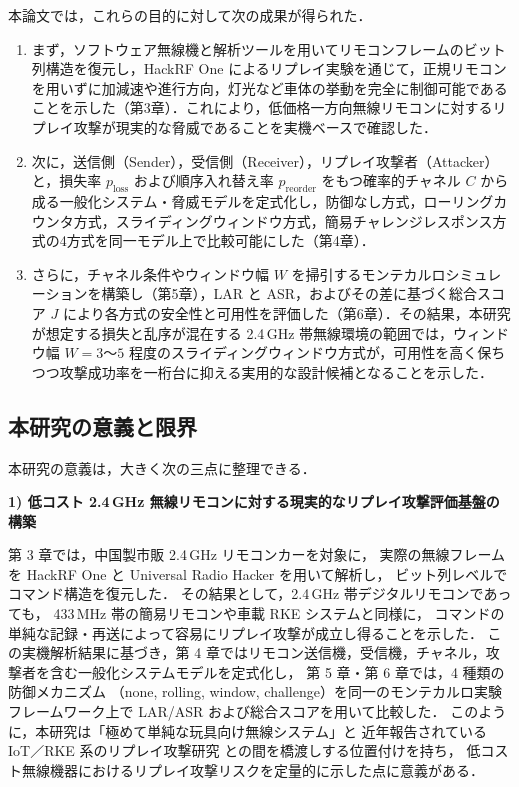 \documentclass[twocolumn,10pt,a4paper]{jsarticle}
\begin{document}
本論文では，これらの目的に対して次の成果が得られた．
\begin{enumerate}
  \item まず，ソフトウェア無線機と解析ツールを用いてリモコンフレームのビット列構造を復元し，HackRF One によるリプレイ実験を通じて，正規リモコンを用いずに加減速や進行方向，灯光など車体の挙動を完全に制御可能であることを示した（第3章）．これにより，低価格一方向無線リモコンに対するリプレイ攻撃が現実的な脅威であることを実機ベースで確認した．
  \item 次に，送信側（Sender），受信側（Receiver），リプレイ攻撃者（Attacker）と，損失率 $p_{\mathrm{loss}}$ および順序入れ替え率 $p_{\mathrm{reorder}}$ をもつ確率的チャネル $C$ から成る一般化システム・脅威モデルを定式化し，防御なし方式，ローリングカウンタ方式，スライディングウィンドウ方式，簡易チャレンジレスポンス方式の4方式を同一モデル上で比較可能にした（第4章）．
  \item さらに，チャネル条件やウィンドウ幅 $W$ を掃引するモンテカルロシミュレーションを構築し（第5章），LAR と ASR，およびその差に基づく総合スコア $J$ により各方式の安全性と可用性を評価した（第6章）．その結果，本研究が想定する損失と乱序が混在する 2.4\,GHz 帯無線環境の範囲では，ウィンドウ幅 $W=3$～$5$ 程度のスライディングウィンドウ方式が，可用性を高く保ちつつ攻撃成功率を一桁台に抑える実用的な設計候補となることを示した．
\end{enumerate}

\subsection{本研究の意義と限界}

本研究の意義は，大きく次の三点に整理できる．

\vspace{0.5em}
\noindent\textbf{1) 低コスト 2.4\,GHz 無線リモコンに対する現実的なリプレイ攻撃評価基盤の構築}\par
第 3 章では，中国製市販 2.4\,GHz リモコンカーを対象に，
実際の無線フレームを HackRF One と Universal Radio Hacker を用いて解析し，
ビット列レベルでコマンド構造を復元した\cite{URH,Mykhaylova2024RCReplay,Garcia2016RKE}．
その結果として，2.4\,GHz 帯デジタルリモコンであっても，
433\,MHz 帯の簡易リモコンや車載 RKE システムと同様に，
コマンドの単純な記録・再送によって容易にリプレイ攻撃が成立し得ることを示した\cite{Anthi2024RFVuln,Lazzaro2024}．
この実機解析結果に基づき，第 4 章ではリモコン送信機，受信機，チャネル，攻撃者を含む一般化システムモデルを定式化し，
第 5 章・第 6 章では，4 種類の防御メカニズム
（none, rolling, window, challenge）を同一のモンテカルロ実験フレームワーク上で
LAR/ASR および総合スコアを用いて比較した．
このように，本研究は「極めて単純な玩具向け無線システム」と
近年報告されている IoT／RKE 系のリプレイ攻撃研究\cite{Mykhaylova2024RCReplay,AbuAlHaija2022,Quintero2023,Anthi2024RFVuln,Lazzaro2024}
との間を橋渡しする位置付けを持ち，
低コスト無線機器におけるリプレイ攻撃リスクを定量的に示した点に意義がある．
\end{document}
